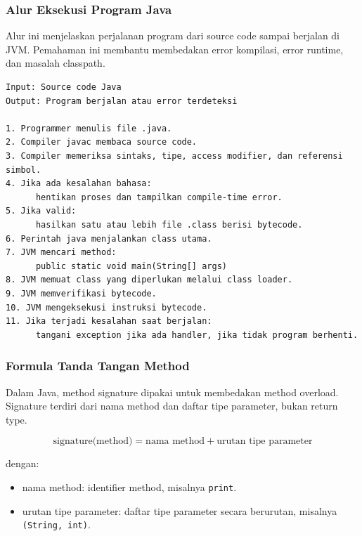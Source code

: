\subsubsection{Alur Eksekusi Program Java}

\begin{jawab}
Alur ini menjelaskan perjalanan program dari source code sampai berjalan di JVM. Pemahaman ini membantu membedakan error kompilasi, error runtime, dan masalah classpath.
\end{jawab}

\begin{lstlisting}[caption={Pseudocode alur kompilasi dan eksekusi Java}, label={lst:alur-eksekusi-java}]
Input: Source code Java
Output: Program berjalan atau error terdeteksi

1. Programmer menulis file .java.
2. Compiler javac membaca source code.
3. Compiler memeriksa sintaks, tipe, access modifier, dan referensi simbol.
4. Jika ada kesalahan bahasa:
      hentikan proses dan tampilkan compile-time error.
5. Jika valid:
      hasilkan satu atau lebih file .class berisi bytecode.
6. Perintah java menjalankan class utama.
7. JVM mencari method:
      public static void main(String[] args)
8. JVM memuat class yang diperlukan melalui class loader.
9. JVM memverifikasi bytecode.
10. JVM mengeksekusi instruksi bytecode.
11. Jika terjadi kesalahan saat berjalan:
      tangani exception jika ada handler, jika tidak program berhenti.
\end{lstlisting}

\subsubsection{Formula Tanda Tangan Method}

\begin{jawab}
Dalam Java, method signature dipakai untuk membedakan method overload. Signature terdiri dari nama method dan daftar tipe parameter, bukan return type.
\end{jawab}

\begin{equation}
    \text{signature(method)} = \text{nama method} + \text{urutan tipe parameter}
    \label{eq:method-signature-java}
\end{equation}

dengan:
\begin{itemize}
    \item nama method: identifier method, misalnya \texttt{print}.
    \item urutan tipe parameter: daftar tipe parameter secara berurutan, misalnya \texttt{(String, int)}.
\end{itemize}

